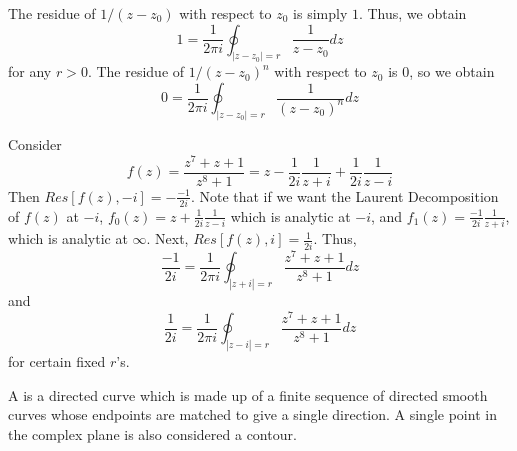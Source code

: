 \documentclass[12pt, a4paper, oneside, openright, titlepage]{book}
\begin{document}
\begin{eg}
    The residue of $1/(z-z_0)$ with respect to $z_0$ is simply $1$. Thus, we obtain \begin{equation*}
        1 = \frac{1}{2\pi i}\oint_{|z-z_0|=r}\frac{1}{z-z_0}dz
    \end{equation*}
    for any $r > 0$. The residue of $1/(z-z_0)^n$ with respect to $z_0$ is $0$, so we obtain \begin{equation*}
        0 = \frac{1}{2\pi i}\oint_{|z-z_0|=r}\frac{1}{(z-z_0)^n}dz
    \end{equation*}
\end{eg}


\begin{eg}
    Consider $$f(z) = \frac{z^7+z+1}{z^8+1} =z - \frac{1}{2i}\frac{1}{z+i}+\frac{1}{2i}\frac{1}{z-i}$$ Then $Res[f(z),-i] = -\frac{-1}{2i}$. Note that if we want the Laurent Decomposition of $f(z)$ at $-i$, $f_0(z) = z+\frac{1}{2i}\frac{1}{z-i}$ which is analytic at $-i$, and $f_1(z) = \frac{-1}{2i}\frac{1}{z+i}$, which is analytic at $\infty$. Next, $Res[f(z),i] = \frac{1}{2i}$. Thus, \begin{equation*}
        \frac{-1}{2i} = \frac{1}{2\pi i}\oint_{|z+i|=r}\frac{z^7+z+1}{z^8+1}dz 
    \end{equation*}
    and \begin{equation*}
        \frac{1}{2i} = \frac{1}{2\pi i}\oint_{|z-i|=r}\frac{z^7+z+1}{z^8+1}dz
    \end{equation*}
    for certain fixed $r$'s.
\end{eg}

\begin{defn}
    A  is a directed curve which is made up of a finite sequence of directed smooth curves whose endpoints are matched to give a single direction. A single point in the complex plane is also considered a contour.
\end{defn}
\end{document}
